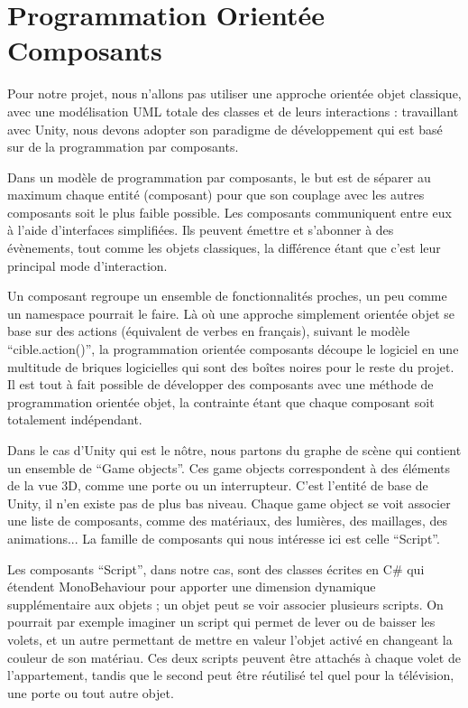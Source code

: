 \section{Programmation Orientée Composants}

Pour notre projet, nous n'allons pas utiliser une approche orientée objet classique, avec une modélisation UML totale des classes et de leurs interactions : travaillant avec Unity, nous devons adopter son paradigme de développement qui est basé sur de la programmation par composants.\newline

Dans un modèle de programmation par composants, le but est de séparer au maximum chaque entité (composant) pour que son couplage avec les autres composants soit le plus faible possible. Les composants communiquent entre eux à l'aide d'interfaces simplifiées. Ils peuvent émettre et s'abonner à des évènements, tout comme les objets classiques, la différence étant que c'est leur principal mode d'interaction.\newline

Un composant regroupe un ensemble de fonctionnalités proches, un peu comme un namespace pourrait le faire. Là où une approche simplement orientée objet se base sur des actions (équivalent de verbes en français), suivant le modèle \enquote{cible.action()}, la programmation orientée composants découpe le logiciel en une multitude de briques logicielles qui sont des boîtes noires pour le reste du projet. Il est tout à fait possible de développer des composants avec une méthode de programmation orientée objet, la contrainte étant que chaque composant soit totalement indépendant.\newline

Dans le cas d'Unity qui est le nôtre, nous partons du graphe de scène qui contient un ensemble de \enquote{Game objects}. Ces game objects correspondent à des éléments de la vue 3D, comme une porte ou un interrupteur. C'est l'entité de base de Unity, il n'en existe pas de plus bas niveau. Chaque game object se voit associer une liste de composants, comme des matériaux, des lumières, des maillages, des animations... La famille de composants qui nous intéresse ici est celle \enquote{Script}.\newline

Les composants \enquote{Script}, dans notre cas, sont des classes écrites en C\# qui étendent MonoBehaviour pour apporter une dimension dynamique supplémentaire aux objets ; un objet peut se voir associer plusieurs scripts. On pourrait par exemple imaginer un script qui permet de lever ou de baisser les volets, et un autre permettant de mettre en valeur l'objet activé en changeant la couleur de son matériau. Ces deux scripts peuvent être attachés à chaque volet de l'appartement, tandis que le second peut être réutilisé tel quel pour la télévision, une porte ou tout autre objet.\newline

